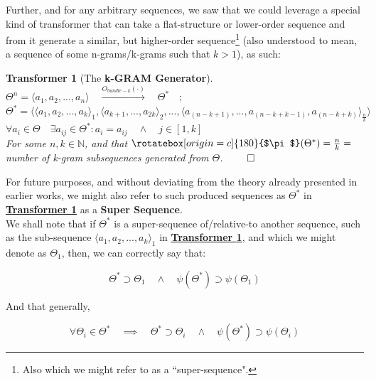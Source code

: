\documentclass[a4paper, 18pt]{book} %
\newtheorem{transf}{Transformer}
\newcommand{\invpi}{\rotatebox[origin=c]{180}{$\pi$}}
\begin{document}
\begin{appendices}
Further, and for any arbitrary sequences, we saw that we could leverage a special kind of transformer that can take a flat-structure or lower-order sequence and from it generate a similar, but higher-order sequence\footnote{Also which we might refer to as a ``super-sequence".} (also understood to mean, a sequence of some n-grams/k-grams such that $k > 1$), as such:

\vspace{1em}
\begin{transf}[The \textbf{k-GRAM Generator}]
\label{TRANSFBUNDb}
$\Theta^n = \langle a_1, a_2,...,a_n\rangle \quad \xrightarrow{O_{bundle-k}(\cdot)} \quad \Theta^* \quad;$\\
$\Theta^* = \langle \langle a_1, a_2,..., a_k \rangle_1, \langle a_{k+1},...,a_{2k} \rangle_2,... , \langle a_{(n-k+1)},...,a_{(n-k+k-1)},a_{(n-k+k)}\rangle_{\frac{n}{k}} \rangle$\\
$\forall a_i \in \Theta \quad \exists a_{ij} \in \Theta^*: a_i = a_{ij} \quad \land \quad j \in [1,k]$\\
For some $n, k \in \mathbb{N}$, and that $\invpi(\Theta^*) = \frac{n}{k} = $ number of k-gram subsequences generated from $\Theta$. $\qed$
\end{transf}
\vspace{1em}

For future purposes, and without deviating from the theory already presented in earlier works, we might also refer to such produced sequences as $\Theta^*$ in \textbf{\hyperref[TRANSFBUNDb]{Transformer \ref{TRANSFBUNDb}}} as a \textbf{Super Sequence}.\\

We shall note that if $\Theta^*$ is a super-sequence of/relative-to another sequence, such as the sub-sequence $\langle a_1, a_2,..., a_k \rangle_1$ in \textbf{\hyperref[TRANSFBUNDb]{Transformer \ref{TRANSFBUNDb}}}, and which we might denote as $\Theta_1$, then, we can correctly say that:

\vspace{1em}
\begin{equation}
\Theta^* \supset \Theta_1 \quad \land \quad \psi(\Theta^*) \supset \psi(\Theta_1)
\end{equation}
\vspace{1em}

And that generally,

\vspace{1em}
\begin{equation}
\forall \Theta_i \in \Theta^* \quad \implies \quad \Theta^* \supset \Theta_i \quad \land \quad \psi(\Theta^*) \supset \psi(\Theta_i)
\end{equation}
\vspace{1em}


\end{appendices}
\end{document}
